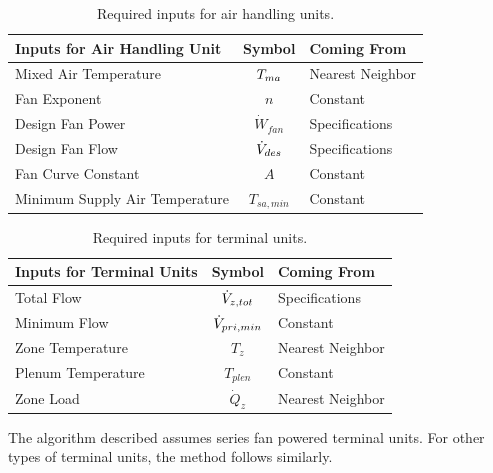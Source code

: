 \begin{table}
\centering
\caption{Required inputs for air handling units.}
\label{tab:RequiredInputsForAHUs}
\begin{tabular}{lcl}\toprule
    Inputs for Air Handling Unit   & Symbol            & Coming From      \\ \midrule
    Mixed Air Temperature          & \(T_{ma}{}\)        & Nearest Neighbor \\
    Fan Exponent                   & \(n\)             & Constant         \\
    Design Fan Power               & \(\dot{W}_{fan}\) & Specifications   \\
    Design Fan Flow                & \(\dot{V}_{des}\)    & Specifications   \\
    Fan Curve Constant             & \(A\)             & Constant         \\
    Minimum Supply Air Temperature & \(T_{sa,min}\)    & Constant         \\ \bottomrule
\end{tabular}
\end{table}

\begin{table}
\centering
\caption{Required inputs for terminal units.}
\label{tab:RequiredInputsForTerminalUnits}
\begin{tabular}{lcl}\toprule
    Inputs for Terminal Units & Symbol             & Coming From      \\ \midrule
    Total Flow                & \(\dot{V}_{z,tot}\) & Specifications   \\
     Minimum Flow             & \(\dot{V}_{pri,min}\) & Constant         \\
     Zone Temperature         & \(T_{z}\)          & Nearest Neighbor \\
     Plenum Temperature       & \(T_{plen}\)       & Constant         \\
     Zone Load                & \(\dot{Q}_{z}\)    & Nearest Neighbor \\ \bottomrule
\end{tabular}
\end{table}


The algorithm described assumes series fan powered terminal units. For
other types of terminal units, the method follows similarly. 

